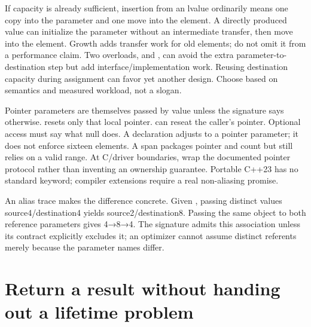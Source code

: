 If capacity is already sufficient, insertion from an lvalue ordinarily means one copy into the parameter and one move into the element. A directly produced value can initialize the parameter without an intermediate transfer, then move into the element. Growth adds transfer work for old elements; do not omit it from a performance claim. Two overloads,  and , can avoid the extra parameter-to-destination step but add interface/implementation work. Reusing destination capacity during assignment can favor yet another design. Choose based on semantics and measured workload, not a slogan.

Pointer parameters are themselves passed by value unless the signature says otherwise.  resets only that local pointer.  can reseat the caller's pointer. Optional access must say what null does. A declaration  adjusts to a pointer parameter; it does not enforce sixteen elements. A span packages pointer and count but still relies on a valid range. At C/driver boundaries, wrap the documented pointer protocol rather than inventing an ownership guarantee. Portable C++23 has no standard  keyword; compiler extensions require a real non-aliasing promise.

An alias trace makes the difference concrete. Given , passing distinct values source4/destination4 yields source2/destination8. Passing the same object to both reference parameters gives 4→8→4. The signature admits this association unless its contract explicitly excludes it; an optimizer cannot assume distinct referents merely because the parameter names differ.

\section{Return a result without handing out a lifetime problem}\label{01-foundations-i-ch003-return-a-result-without-handing-out-a-lifetime-problem}

